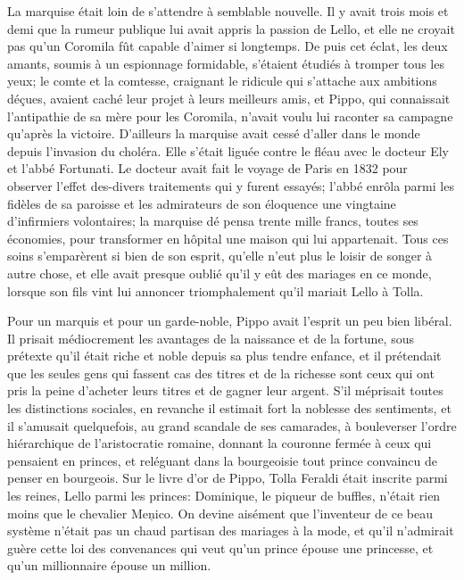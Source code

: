 La marquise était loin de s'attendre à semblable nouvelle. Il y avait
trois mois et demi que la rumeur publique lui avait appris la passion de
Lello, et elle ne croyait pas qu'un Coromila fût capable d'aimer si
longtemps. De puis cet éclat, les deux amants, soumis à un espionnage
formidable, s'étaient étudiés à tromper tous les yeux; le comte et la
comtesse, craignant le ridicule qui s'attache aux ambitions déçues,
avaient caché leur projet à leurs meilleurs amis, et Pippo, qui
connaissait l'antipathie de sa mère pour les Coromila, n'avait voulu lui
raconter sa campagne qu'après la victoire. D'ailleurs la marquise avait
cessé d'aller dans le monde depuis l'invasion du choléra. Elle s'était
liguée contre le fléau avec le docteur Ely et l'abbé Fortunati. Le
docteur avait fait le voyage de Paris en 1832 pour observer l'effet
des-divers traitements qui y furent essayés; l'abbé enrôla parmi les
fidèles de sa paroisse et les admirateurs de son éloquence une vingtaine
d'infirmiers volontaires; la marquise dé pensa trente mille francs,
toutes ses économies, pour transformer en hôpital une maison qui lui
appartenait. Tous ces soins s'emparèrent si bien de son esprit, qu'elle
n'eut plus le loisir de songer à autre chose, et elle avait presque
oublié qu'il y eût des mariages en ce monde, lorsque son fils vint lui
annoncer triomphalement qu'il mariait Lello à Tolla.

Pour un marquis et pour un garde-noble, Pippo avait l'esprit un peu bien
libéral. Il prisait médiocrement les avantages de la naissance et de la
fortune, sous prétexte qu'il était riche et noble depuis sa plus tendre
enfance, et il prétendait que les seules gens qui fassent cas des titres
et de la richesse sont ceux qui ont pris la peine d'acheter leurs titres
et de gagner leur argent. S'il méprisait toutes les distinctions
sociales, en revanche il estimait fort la noblesse des sentiments, et il
s'amusait quelquefois, au grand scandale de ses camarades, à bouleverser
l'ordre hiérarchique de l'aristocratie romaine, donnant la couronne
fermée à ceux qui pensaient en princes, et reléguant dans la bourgeoisie
tout prince convaincu de penser en bourgeois. Sur le livre d'or de
Pippo, Tolla Feraldi était inscrite parmi les reines, Lello parmi les
princes: Dominique, le piqueur de buffles, n'était rien moins que le
chevalier Meņico. On devine aisément que l'inventeur de ce beau système
n'était pas un chaud partisan des mariages à la mode, et qu'il
n'admirait guère cette loi des convenances qui veut qu'un prince épouse
une princesse, et qu'un millionnaire épouse un million.

